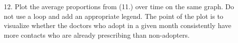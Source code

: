 \documentclass[12pt, leqno]{article}
\begin{document}
\begin{enumerate}
\item[12.] Plot the average proportions from (11.) over time on the same graph.  Do not use a loop and add an appropriate legend.  The point of the plot is to visualize whether the doctors who adopt in a given month consistently have more contacts who are already prescribing than non-adopters.

\end{enumerate}
\end{document}
